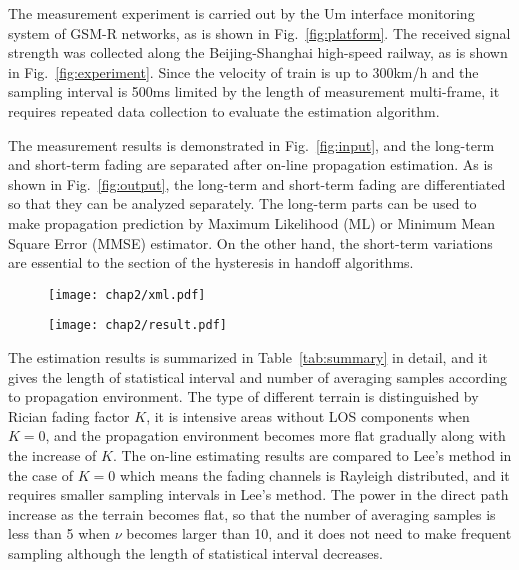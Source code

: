 The measurement experiment is carried out by the Um interface monitoring system of GSM-R networks, as is shown in Fig.~\ref{fig:platform}. The received signal strength was collected along the Beijing-Shanghai high-speed railway, as is shown in Fig.~\ref{fig:experiment}. Since the velocity of train is up to 300km/h and the sampling interval is 500ms limited by the length of measurement multi-frame, it requires repeated data collection to evaluate the estimation algorithm.


The measurement results is demonstrated in Fig.~\ref{fig:input}, and the long-term and short-term fading are separated after on-line propagation estimation. As is shown in Fig.~\ref{fig:output}, the long-term and short-term fading are differentiated so that they can be analyzed separately. The long-term parts can be used to make propagation prediction by Maximum Likelihood (ML) or Minimum Mean Square Error (MMSE) estimator. On the other hand, the short-term variations are essential to the section of the hysteresis in handoff algorithms.

\begin{figure}[!htp]
\centering
\texttt{[image: chap2/xml.pdf]}
\end{figure}

\begin{figure}[!htp]
\centering
\texttt{[image: chap2/result.pdf]}
\end{figure}

The estimation results is summarized in Table~\ref{tab:summary} in detail, and it gives the length of statistical interval and number of averaging samples according to propagation environment. The type of different terrain is distinguished by Rician fading factor $K$, it is intensive areas without LOS components when $K=0$, and the propagation environment becomes more flat gradually along with the increase of $K$. The on-line estimating results are compared to Lee's method in the case of $K=0$ which means the fading channels is Rayleigh distributed, and it requires smaller sampling intervals in Lee's method. The power in the direct path increase as the terrain becomes flat, so that the number of averaging samples is less than 5 when $\nu$ becomes larger than 10, and it does not need to make frequent sampling although the length of statistical interval decreases.


